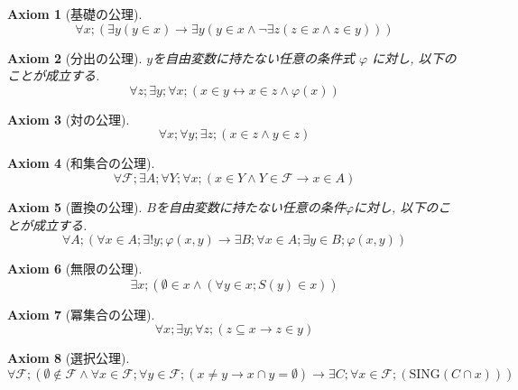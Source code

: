 \documentclass[lualatex]{ltjsbook}
\theoremstyle{remark}
\theoremstyle{plain}
\newtheorem{axiom}{Axiom}
\begin{document}
\begin{axiom}[基礎の公理]
	 $$\forall x;  \left( \exists y( y \in x) \rightarrow \exists y \left( y\in x \land \lnot \exists z \left( z \in x \land z \in y \right)  \right)   \right) $$ 
	
\end{axiom}

\begin{axiom}[分出の公理]
	$y$を自由変数に持たない任意の条件式 $\varphi$ に対し, 以下のことが成立する.
	\[
	\forall z; \exists y; \forall x;\left(x \in y \leftrightarrow x \in z \land \varphi(x)  \right) 
	\] 
\end{axiom}

\begin{axiom}[対の公理]
	\[
	\forall x; \forall y; \exists z; \left( x \in z \land y \in z \right) 
	\] 
\end{axiom}

\begin{axiom}[和集合の公理]
	\[
	\forall \mathcal{F}; \exists A; \forall Y; \forall x ;\left( x \in Y \land Y \in \mathcal{F} \rightarrow x \in A \right) 
	\] 		
\end{axiom}

\begin{axiom}[置換の公理]
	$B$を自由変数に持たない任意の条件$\varphi$に対し, 以下のことが成立する.
	\[
	\forall A;\left( \forall x \in A; \exists! y ; \varphi(x,y) \rightarrow \exists B; \forall x \in A; \exists y \in B; \varphi(x,y) \right) 
	\] 
\end{axiom}

\begin{axiom}[無限の公理]
	 \[
	\exists x ;\left( \emptyset \in x \land (\forall y \in x; S(y) \in x) \right) 
	\] 
	
\end{axiom}

\begin{axiom}[冪集合の公理]
	\[
	\forall x;\exists y;\forall z;\left( z \subseteq x \rightarrow z \in y \right) 
	\] 
\end{axiom}

\begin{axiom}[選択公理]
	 \[
		 \forall \mathcal{F};\left( \emptyset \not\in  \mathcal{F} \land \forall x \in \mathcal{F};\forall y \in \mathcal{F};\left( x \neq y \rightarrow x \cap y = \emptyset \right) \rightarrow \exists C; \forall x \in \mathcal{F};\left( \mathrm{SING}\left( C \cap x \right)  \right)  \right) 
	\] 
\end{axiom}
\end{document}
